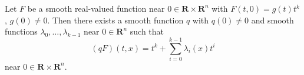 Let $F$ be a smooth real-valued function near $0 \in \mathbf{R} \times \mathbf{R}^n$ with $F(t, 0) = g(t)t^k$, $g(0) \neq 0$. Then there exists a smooth function $q$ with $q(0) \neq 0$ and smooth functions $\lambda_0, \ldots, \lambda_{k-1}$ near $0 \in \mathbf{R}^n$ such that
$$(qF)(t, x) = t^k + \sum_{i=0}^{k-1} \lambda_i(x) t^i$$
near $0 \in \mathbf{R} \times \mathbf{R}^n$.
